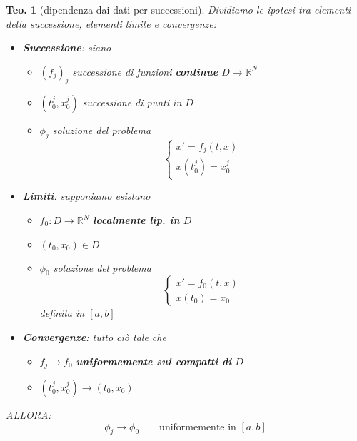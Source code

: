 \documentclass[a4paper,10pt]{article}
\newcommand{\re}{\mathbb{R}} %
\theoremstyle{indentdefinition}
\theoremstyle{indenttheorem}
\newtheorem{thm}{Teo.}
\theoremstyle{myremark}
\theoremstyle{indentgeneral}
\begin{document}
\begin{thm}[dipendenza dai dati per successioni] Dividiamo le ipotesi tra elementi della successione, elementi limite e convergenze:
\begin{itemize}
    \item \textbf{Successione}: siano 
    \begin{itemize}
        \item $(f_j)_j$ successione di funzioni \textbf{continue} $D\to\re^N$
        \item $(t_0^j,x_0^j)$ successione di punti in $D$
        \item $\phi_j$ soluzione del problema 
        $$\begin{cases}
            x'=f_j(t,x) \\
            x(t_0^j)=x_0^j
        \end{cases}$$
    \end{itemize}
    \item \textbf{Limiti}: supponiamo esistano
    \begin{itemize}
        \item $f_0:D\to\re^N$ \textbf{localmente lip. in} $D$
        \item $(t_0,x_0)\in D $ 
        \item $\phi_0$ soluzione del problema 
        $$\begin{cases}
            x'=f_0(t,x) \\
            x(t_0)=x_0
        \end{cases}$$
    definita in $[a,b]$
    \end{itemize}
    \item \textbf{Convergenze}: tutto ciò tale che
    \begin{itemize}
        \item $f_j\to f_0$ \textbf{uniformemente  sui compatti di} $D$
        \item $(t_0^j,x_0^j)\to(t_0,x_0) $
    \end{itemize}
\end{itemize}
    ALLORA:
    $$\phi_j\to\phi_0 \quad   \quad \text{uniformemente in $[a,b]$}$$
\end{thm}
\end{document}
